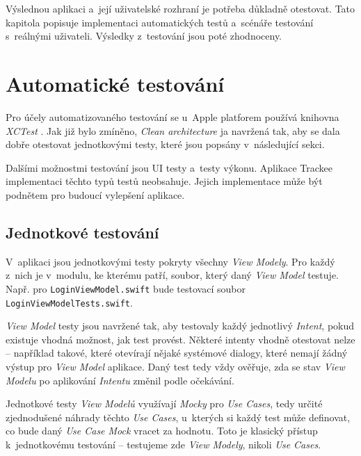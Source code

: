 Výslednou aplikaci a~její uživatelské rozhraní je potřeba důkladně otestovat. Tato kapitola popisuje implementaci automatických testů a~scénáře testování s~reálnými uživateli. Výsledky z~testování jsou poté zhodnoceny.

\section{Automatické testování}

Pro účely automatizovaného testování se u~Apple platforem používá knihovna \emph{XCTest} \cite{xctest}. Jak již bylo zmíněno, \emph{Clean architecture} ja navržená tak, aby se dala dobře otestovat jednotkovými testy, které jsou popsány v~následující sekci.

Dalšími možnostmi testování jsou UI testy a~testy výkonu. Aplikace Trackee implementaci těchto typů testů neobsahuje. Jejich implementace může být podnětem pro budoucí vylepšení aplikace.

\subsection{Jednotkové testování}

V~aplikaci jsou jednotkovými testy pokryty všechny \emph{View Modely}. Pro každý z~nich je v~modulu, ke kterému patří, soubor, který daný \emph{View Model} testuje. Např. pro \texttt{LoginViewModel.swift} bude testovací soubor \texttt{LoginViewModelTests.swift}.

\emph{View Model} testy jsou navržené tak, aby testovaly každý jednotlivý \emph{Intent}, pokud existuje vhodná možnost, jak test provést. Některé intenty vhodně otestovat nelze – například takové, které otevírají nějaké systémové dialogy, které nemají žádný výstup pro \emph{View Model} aplikace. Daný test tedy vždy ověřuje, zda se stav \emph{View Modelu} po aplikování \emph{Intentu} změnil podle očekávání.

Jednotkové testy \emph{View Modelů} využívají \emph{Mocky} pro \emph{Use Cases}, tedy určité zjednodušené náhrady těchto \emph{Use Cases}, u~kterých si každý test může definovat, co bude daný \emph{Use Case Mock} vracet za hodnotu. Toto je klasický přístup k~jednotkovému testování – testujeme zde \emph{View Modely}, nikoli \emph{Use Cases}.

